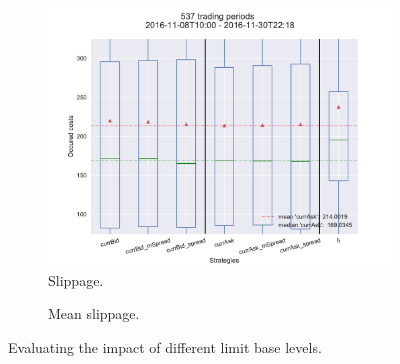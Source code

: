 \begin{figure}[ht]
	\centering
	
	\begin{subfigure}[b]{0.6\textwidth}
        		\centering
        		\includegraphics[width=\textwidth]{content/drawings/performance_limitBase_nov}
        		\caption{Slippage.}
		\label{fig:actionlimitmapping:plot}
    	\end{subfigure}%
	\begin{subfigure}[b]{0.30\textwidth}
        		\centering
		  \vspace{1.5cm}      		 
        		\caption{Mean slippage.}
		\label{fig:actionlimitmapping:mean}
    	\end{subfigure}

	\caption{Evaluating the impact of different limit base levels.}
	\label{fig:actionlimitmapping}
\end{figure}

